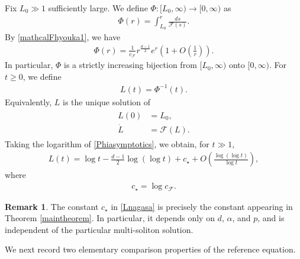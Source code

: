 \documentclass[reqno]{amsart}
\theoremstyle{plain}
\theoremstyle{definition}
\newtheorem{remark}{Remark}[section]
\numberwithin{equation}{section}
\begin{document}
Fix $L_0\gg1$ sufficiently large. We define $\Phi:[L_0,\infty)\to[0,\infty)$ as 
\begin{align}\label{Phidef}
\Phi(r)=\int_{L_0}^r\frac{ds}{\mathcal{F}(s)}.
\end{align}
By \eqref{mathcalFhyouka1}, we have
\begin{align}\label{Phiasymptotics}
\Phi(r)=\frac{1}{c_{\mathcal{F}}}r^{\frac{d-1}{2}} e^r\left(1+O\left(\frac{1}{r}\right)\right).
\end{align}
In particular, $\Phi$ is a strictly increasing bijection from $[L_0,\infty)$ onto $[0,\infty)$. For $t\geq0$, we define
\begin{align}\label{LdefPhi}
L(t)=\Phi^{-1}(t).
\end{align}
Equivalently, $L$ is the unique solution of
\begin{align}\label{Lnoode}
\begin{aligned}
L(0)&=L_0,
\\
\dot{L}&=\mathcal{F}(L).
\end{aligned}
\end{align}
Taking the logarithm of \eqref{Phiasymptotics}, we obtain, for $t\gg1$,
\begin{align}\label{Lnagasa}
L(t)=\log{t}-\frac{d-1}{2}\log{(\log{t})}+c_{\star}+O\left(\frac{\log{(\log{t})}}{\log{t}}\right),
\end{align}
where
\begin{align*}
c_{\star}=\log c_{\mathcal{F}}.
\end{align*}

\begin{remark}
The constant $c_{\star}$ in \eqref{Lnagasa} is precisely the constant appearing in Theorem \ref{maintheorem}. In particular, it depends only on $d$, $\alpha$, and $p$, and is independent of the particular multi-soliton solution.
\end{remark}

We next record two elementary comparison properties of the reference equation.
\end{document}
